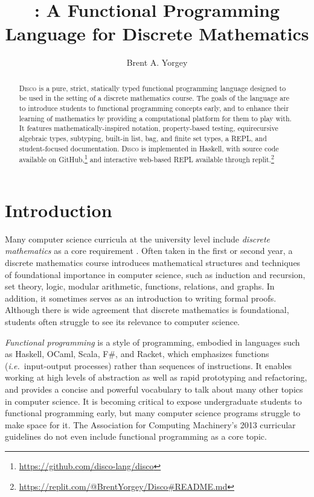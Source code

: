 \documentclass[submission,copyright,creativecommons]{eptcs}
\title{\disco: A Functional Programming Language for Discrete Mathematics}
\author{Brent A. Yorgey
\institute{Hendrix College\\ Conway, Arkansas, USA}
\email{yorgey@hendrix.edu}
}
\newcommand{\disco}{\textsc{Disco}\xspace}
\newcommand{\ie}{\emph{i.e.}\ }
\newcommand{\todo}[1]{\textcolor{red}{[TODO: #1]}}
\newcommand{\todo}[1]{}
\begin{document}
\maketitle


\begin{abstract}
  \disco is a pure, strict, statically typed functional programming
  language designed to be used in the setting of a discrete
  mathematics course. The goals of the language are to introduce
  students to functional programming concepts early, and to enhance
  their learning of mathematics by providing a computational platform
  for them to play with.  It features mathematically-inspired notation,
  property-based testing, equirecursive algebraic types, subtyping,
  built-in list, bag, and finite set types, a REPL, and student-focused
  documentation.  \disco is implemented in Haskell, with source code
  available on
  GitHub,\footnote{\url{https://github.com/disco-lang/disco}} and
  interactive web-based REPL available through
  replit.\footnote{\url{https://replit.com/@BrentYorgey/Disco\#README.md}}
\end{abstract}

\section{Introduction}
\label{sec:introduction}

Many computer science curricula at the university level include
\emph{discrete mathematics} as a core requirement \cite{ACM:2013}.
Often taken in the first or second year, a discrete mathematics course
introduces mathematical structures and techniques of foundational
importance in computer science, such as induction and recursion, set
theory, logic, modular arithmetic, functions, relations, and graphs.
In addition, it sometimes serves as an introduction to writing formal
proofs.  Although there is wide agreement that discrete mathematics is
foundational, students often struggle to see its relevance to
computer science.

\emph{Functional programming} is a style of programming, embodied in
languages such as Haskell, OCaml, Scala, F\#, and Racket, which
emphasizes functions (\ie input-output processes) rather than
sequences of instructions. It enables working at high levels of
abstraction as well as rapid prototyping and refactoring, and provides
a concise and powerful vocabulary to talk about many other topics in
computer science.  It is becoming critical to expose undergraduate
students to functional programming early, but many computer science
programs struggle to make space for it.  The Association for Computing
Machinery's 2013 curricular guidelines \cite{ACM:2013} do not even
include functional programming as a core topic.
\end{document}

